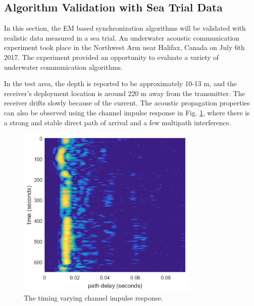 \documentclass[journal,comsoc,onecolumn, 12pt,draftclsnofoot]{IEEEtran}
\begin{document}
% 
% 

\subsection{Algorithm Validation with Sea Trial Data }
\label{sec:per_sea}
In this section, the EM based synchronization algorithms will be validated with realistic data measured in a sea trial. 
An underwater acoustic communication experiment took place in the Northwest Arm near Halifax, Canada on July 6th 2017. 
The experiment provided an opportunity to evaluate a variety of underwater communication algorithms.

In the test area, the depth is reported to be approximately 10-13 m, and the receiver's deployment location is around 220 m away from the transmitter.
The receiver drifts slowly because of the current.
The acoustic propagation properties can also be observed using the channel impulse response in Fig. \ref{fig:chan_impu}, where there is a strong and stable direct path of arrival and a few multipath interference.
\begin{figure}[htbp]
\centering
\includegraphics[width=3.5in]{pic/channel.png}
\caption{The timing varying channel impulse response.}
\label{fig:chan_impu} 
\end{figure}
\end{document}
